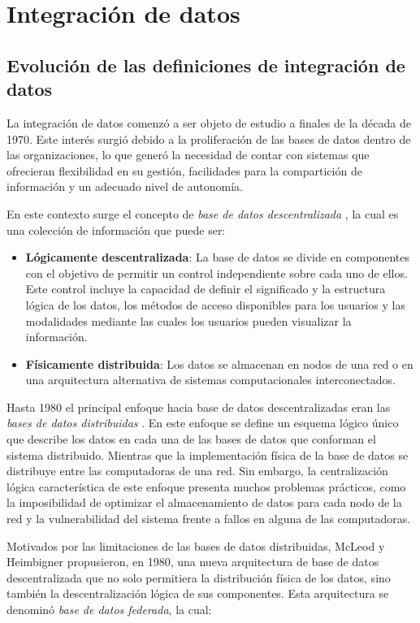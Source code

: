 \section{Integraci\'on de datos}

\subsection{Evolución de las definiciones de integración de datos}

La integración de datos comenzó a ser objeto de estudio a finales de la década de
1970. Este interés surgió debido a la proliferación de las bases de datos dentro de las organizaciones,
lo que generó la necesidad de contar con sistemas que ofrecieran flexibilidad en su gestión, 
facilidades para la compartición de información y un adecuado nivel de autonomía.

En este contexto surge el concepto de \textit{base de datos descentralizada} \cite{mcleod1980federated}, la cual es una
colección de información que puede ser:
\begin{itemize}
    \item \textbf{Lógicamente descentralizada}: La base de datos se divide en componentes con el objetivo
    de permitir un control independiente sobre cada uno de ellos. Este control incluye la capacidad de definir
    el significado y la estructura lógica de los datos, los métodos de acceso disponibles para los usuarios y las
    modalidades mediante las cuales los usuarios pueden visualizar la información.
    \item \textbf{Físicamente distribuida}: Los datos se almacenan en nodos de una red o en una arquitectura alternativa de
    sistemas computacionales interconectados.
\end{itemize}

Hasta 1980 el principal enfoque hacia base de datos descentralizadas eran las
\textit{bases de datos distribuidas} \cite{mcleod1980federated}. En este enfoque se define un esquema lógico
único que describe los datos en cada una de las bases de datos que conforman el sistema distribuido. Mientras que la implementación
física de la base de datos se distribuye entre las computadoras de una red. Sin embargo,
la centralización lógica característica de este enfoque presenta muchos problemas prácticos, como la
imposibilidad de optimizar el almacenamiento de datos para cada nodo de la red y la vulnerabilidad del sistema frente a fallos en alguna de las computadoras.


Motivados por las limitaciones de las bases de datos distribuidas, McLeod y Heimbigner \cite{mcleod1980federated} propusieron, en 1980, una nueva
arquitectura de base de datos descentralizada que no solo permitiera la distribución física de los datos, sino también
la descentralización lógica de sus componentes. Esta arquitectura se denominó \textit{base de datos federada}, la cual:

